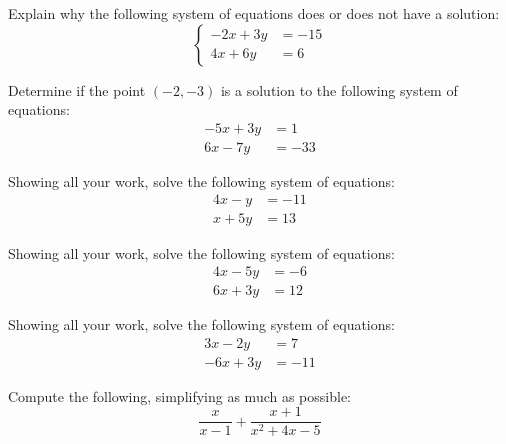 \documentclass[11pt,letterpaper]{article}
\begin{document}

 Explain why the following system of equations does or does not have a solution:
	\[
	\left\{\begin{aligned}
	-2x + 3y&= -15 \\
	4x + 6y&= 6
	\end{aligned}\right.
	\]



\newpage



 Determine if the point $(-2, -3)$ is a solution to the following system of equations:
	\[
	\begin{aligned}
	-5x + 3y&= 1 \\
	6x - 7y&= -33
	\end{aligned}
	\]



\newpage



 Showing all your work, solve the following system of equations:
	\[
	\begin{aligned}
	4x - y&= -11 \\
	x + 5y&= 13
	\end{aligned}
	\]



\newpage



 Showing all your work, solve the following system of equations:
	\[
	\begin{aligned}
	4x - 5y&= -6 \\
	6x + 3y&= 12
	\end{aligned}
	\] 



\newpage



 Showing all your work, solve the following system of equations:
	\[
	\begin{aligned}
	3x - 2y&= 7 \\
	-6x + 3y&= -11
	\end{aligned}
	\]



\newpage



 Compute the following, simplifying as much as possible:
	\[
	\dfrac{x}{x - 1} + \dfrac{x + 1}{x^2 + 4x - 5}
	\]
\end{document}
